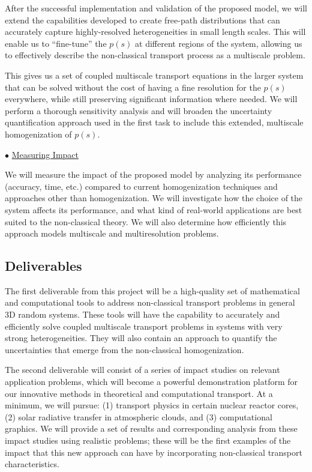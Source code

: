 \documentclass[12pt]{article}
\begin{document}
After the successful implementation and validation of the proposed model, we will extend the capabilities developed to create free-path distributions that can accurately capture highly-resolved heterogeneities in small length scales.
This will enable us to ``fine-tune'' the $p(s)$ at different regions of the system, allowing us to effectively describe the non-classical transport process as a multiscale problem.

This gives us a set of coupled multiscale transport equations in the larger system that can be solved without the cost of having a fine resolution for the $p(s)$ everywhere, while still preserving significant information where needed.
We will perform a thorough sensitivity analysis and will broaden the uncertainty quantification approach used in the first task to include this extended, multiscale homogenization of $p(s)$.

$\bullet$ \underline{Measuring Impact}

We will measure the impact of the proposed model by analyzing its performance (accuracy, time, etc.) compared to current homogenization techniques and approaches other than homogenization.
We will investigate how the choice of the system affects its performance, and what kind of real-world applications are best suited to the non-classical theory.
We will also determine how efficiently this approach models multiscale and multiresolution problems.


\subsection{Deliverables}

The first deliverable from this project will be a high-quality set of mathematical and computational tools to address non-classical transport problems in general 3D random systems.
These tools will have the capability to accurately and efficiently solve coupled multiscale transport problems in systems with very strong heterogeneities.
They will also contain an approach to quantify the uncertainties that emerge from the non-classical homogenization.

The second deliverable will consist of a series of impact studies on relevant application problems, which will become a powerful demonstration platform for our innovative methods in theoretical and computational transport.
At a minimum, we will pursue:
(1) transport physics in certain nuclear reactor cores,
(2) solar radiative transfer in atmospheric clouds, and
(3) computational graphics.
We will provide a set of results and corresponding analysis from these impact studies using realistic problems;
these will be the first examples of the impact that this new approach can have by incorporating non-classical transport characteristics.
\end{document}
